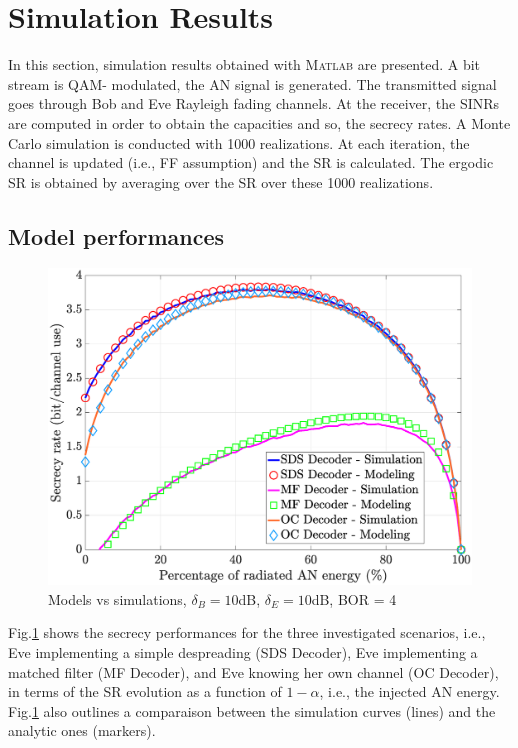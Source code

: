 \documentclass[journal,comsoc]{IEEEtran}
\let\MYoriglatexcaption\caption
\renewcommand{\caption}[2][\relax]{\MYoriglatexcaption[#2]{#2}}
\begin{document}
\section{Simulation Results} \label{sec:simulation-results}
In this section, simulation results obtained with \textsc{Matlab} are presented. A bit stream is QAM- modulated, the AN signal is generated. The transmitted signal goes through Bob and Eve Rayleigh fading channels. At the receiver, the SINRs are computed in order to obtain the capacities and so, the secrecy rates. A Monte Carlo simulation is conducted with 1000 realizations. At each iteration, the channel is updated (i.e., FF assumption) and the SR is calculated. The ergodic SR is obtained by averaging over the SR over these 1000 realizations. 
\subsection{Model performances}
\begin{figure}[h!t]
	\centering
	\includegraphics[width=1\linewidth]{graphs/SISO_SR_10dB.eps}
	\caption{Models vs simulations, $\delta_B = 10$dB,  $\delta_E = 10$dB, BOR = 4}
	\label{fig_modelvssimu}
\end{figure}
Fig.\ref{fig_modelvssimu} shows the secrecy performances for the three investigated scenarios, i.e., Eve implementing a simple despreading (SDS Decoder), Eve implementing a matched filter (MF Decoder), and Eve knowing her own channel (OC Decoder), in terms of the SR evolution as a function of $1-\alpha$, i.e., the injected AN energy. Fig.\ref{fig_modelvssimu} also outlines a comparaison between the simulation curves (lines) and the analytic ones (markers).
\end{document}
